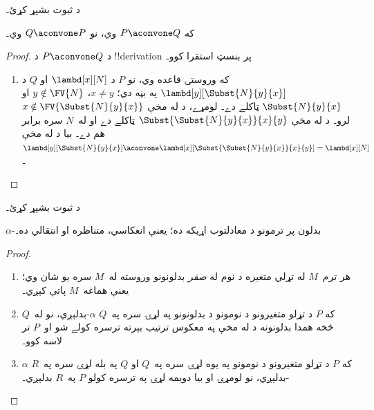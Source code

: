 \documentclass[../../../include/open-logic-section]{subfiles}
\begin{document}
\begin{prob}
  د  ثبوت بشپړ کړئ۔
\end{prob}

\begin{lem}
  که $P \aconvone Q$ وي، نو $Q \aconvone P$ وي۔
\end{lem}

\begin{proof}
  د $P \aconvone Q$ د !!{derivation} پر بنسټ استقرا کوو۔
  \begin{enumerate}
  \item که وروستۍ قاعده  وي، نو $P$ د
    $\lambd[x][N]$ او $Q$ د
    $\lambd[y][\Subst{N}{y}{x}]$ په بڼه دي؛ $x \neq y$،
    $y \notin \FV{N}$ او $\Subst{N}{y}{x}$ ټاکلے دے۔ لومړے، د
     له مخې
    $x \notin \FV{\Subst{N}{y}{x}}$ لرو۔ د
     له مخې
    $\Subst{\Subst{N}{y}{x}}{x}{y}$ ټاکلے دے او له~$N$ سره
    برابر هم دے۔ بيا د  له مخې
    $\lambd[y][\Subst{N}{y}{x}]
    \aconvone \lambd[x][\Subst{\Subst{N}{y}{x}}{x}{y}] =
    \lambd[x][N]$۔
  \end{enumerate}
\end{proof}

\begin{prob}
  د  ثبوت بشپړ کړئ۔
\end{prob}

\begin{thm}
  $\alpha$-بدلون پر ترمونو د معادلتوب اړيکه ده؛ يعنې انعکاسي،
  متناظره او انتقالي ده۔
\end{thm}

\begin{proof}
  \begin{enumerate}
  \item هر ترم~$M$ له تړلي متغيره د نوم له \emph{صفر} بدلونونو
    وروسته له~$M$ سره يو شان وي؛ يعنې هماغه~$M$ پاتې کېږي۔
  \item که $P$ د تړلو متغيرونو د نومونو د بدلونونو په لړۍ سره
    په~$Q$ $\alpha$-بدلېږي، نو له~$Q$ څخه همدا بدلونونه د
     له مخې په معکوس ترتيب بېرته ترسره کولے شو
    او~$P$ تر لاسه کوو۔
  \item که $P$ د تړلو متغيرونو د نومونو په يوه لړۍ سره په~$Q$
    او $Q$ په بله لړۍ سره په~$R$ $\alpha$-بدلېږي، نو لومړۍ او بيا
    دويمه لړۍ په ترسره کولو $P$ په~$R$ بدلېږي۔
  \end{enumerate}
\end{proof}
\end{document}
